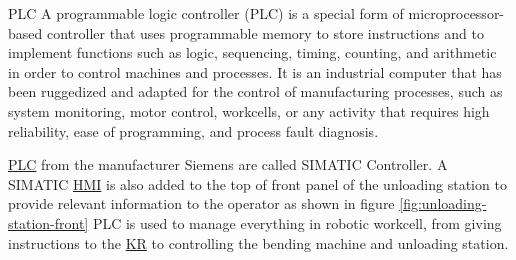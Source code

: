 PLC
A programmable logic controller (PLC) is a special form of microprocessor-based controller that uses programmable memory to store 
instructions and to implement functions such as logic, sequencing, timing, counting, and arithmetic in order to control machines and processes. \cite[page 5]{bolton2015programmable}
It is an industrial computer that has been ruggedized and adapted for the control of manufacturing processes, 
such as system monitoring, motor control, workcells, or any activity that requires high reliability, ease of programming, and process fault diagnosis. \cite{ALPHONSUS20161185}

\hyperref[acro:PLC]{PLC} from the manufacturer Siemens are called SIMATIC Controller. \cite{siemens} A SIMATIC \hyperref[acro:HMI]{HMI} is also added to the top of front panel of the unloading station to provide
relevant information to the operator as shown in figure \ref{fig:unloading-station-front} PLC is used to manage everything in robotic workcell,
from giving instructions to the \hyperref[acro:KR]{KR} to controlling the bending machine and unloading station.